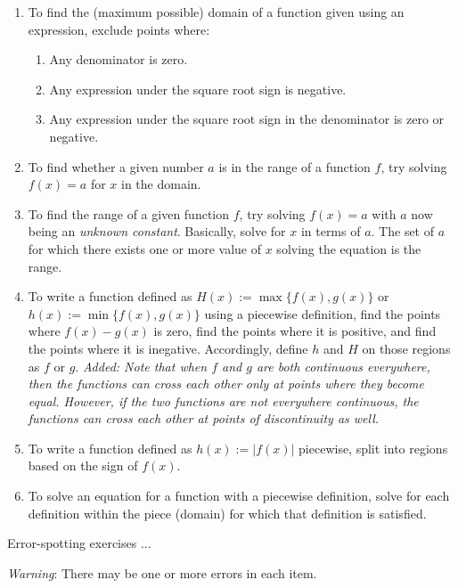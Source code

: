 \documentclass[10pt]{amsart}
\begin{document}
\begin{enumerate}
\item To find the (maximum possible) domain of a function given using
  an expression, exclude points where:
  
  \begin{enumerate}
  \item Any denominator is zero.
  \item Any expression under the square root sign is negative.
  \item Any expression under the square root sign in the denominator is
    zero or negative.
  \end{enumerate}

\item To find whether a given number $a$ is in the range of a function
  $f$, try solving $f(x) = a$ for $x$ in the domain.
\item To find the range of a given function $f$, try solving $f(x) =
  a$ with $a$ now being an {\em unknown constant}. Basically, solve
  for $x$ in terms of $a$. The set of $a$ for which there exists one
  or more value of $x$ solving the equation is the range.
\item To write a function defined as $H(x) := \max \{ f(x), g(x) \}$
  or $h(x) := \min\{ f(x), g(x) \}$ using a piecewise definition, find
  the points where $f(x) - g(x)$ is zero, find the points where it is
  positive, and find the points where it is inegative. Accordingly,
  define $h$ and $H$ on those regions as $f$ or $g$. {\em Added: Note
  that when $f$ and $g$ are both continuous everywhere, then the
  functions can cross each other only at points where they become
  equal. However, if the two functions are not everywhere continuous,
  the functions can cross each other at points of discontinuity as
  well.}
\item To write a function defined as $h(x) := |f(x)|$ piecewise, split
  into regions based on the sign of $f(x)$.
\item To solve an equation for a function with a piecewise definition,
  solve for each definition within the piece (domain) for which that
  definition is satisfied.
\end{enumerate}

Error-spotting exercises ...

{\em Warning}: There may be one or more errors in each item.
\end{document}

